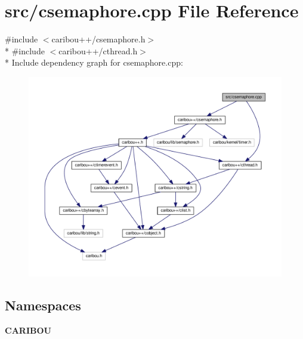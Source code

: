 \section{src/csemaphore.cpp File Reference}
\label{csemaphore_8cpp}
{\ttfamily \#include $<$caribou++/csemaphore.\+h$>$}\\*
{\ttfamily \#include $<$caribou++/cthread.\+h$>$}\\*
Include dependency graph for csemaphore.\+cpp\+:
\nopagebreak
\begin{figure}[H]
\begin{center}
\leavevmode
\includegraphics[width=350pt]{csemaphore_8cpp__incl}
\end{center}
\end{figure}
\subsection*{Namespaces}
\begin{DoxyCompactItemize}
\item 
 {\bf C\+A\+R\+I\+B\+OU}
\end{DoxyCompactItemize}
